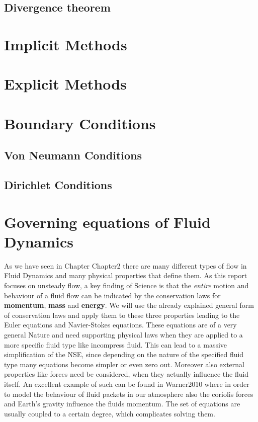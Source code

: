 \subsection{Divergence theorem}
\label{sec:div_theorem}

\section{Implicit Methods}
\section{Explicit Methods}

\section{Boundary Conditions}
\subsection{Von Neumann Conditions}
\subsection{Dirichlet Conditions}

\section{Governing equations of Fluid Dynamics}

As we have seen in Chapter Chapter2 there are many different types of flow in Fluid Dynamics and many physical properties that define them. As this report focuses on unsteady flow, a key finding of Science is that the \emph{entire} motion and behaviour of a fluid flow can be indicated by the conservation laws for \textbf{momentum}, \textbf{mass} and \textbf{energy}. We will use the already explained general form of conservation laws and apply them to these three properties leading to the Euler equations and Navier-Stokes equations. These equations are of a very general Nature and need supporting physical laws when they are applied to a more specific fluid type like incompress fluid. This can lead to a massive simplification of the NSE, since depending on the nature of the specified fluid type many equations become simpler or even zero out. Moreover also external properties like forces need be considered, when they actually influence the fluid itself. An excellent example of such can be found in Warner2010 where in order to model the behaviour of fluid packets in our atmosphere also the coriolis forces and Earth's gravity influence the fluids momentum. The set of equations are usually coupled to a certain degree, which complicates solving them. 

